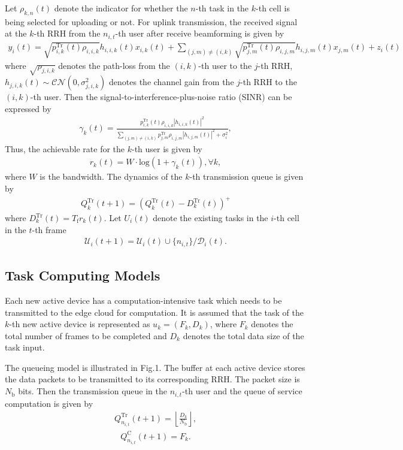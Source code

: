% 
Let $\rho_{k, n}(t)$ denote the indicator for whether the $n$-th task in the $k$-th cell is being selected for uploading or not.
For uplink transmission, the received signal at the $k$-th RRH from the $n_{i,t}$-th user after receive beamforming is given by
\begin{align}
    y_{i}(t) = \sqrt{p_{i,k}^{\mathrm{Tr}}(t)\rho_{i,i,k}}h_{i,i,k}(t)x_{i,k}(t)+\sum_{(j,m)\neq (i,k)}\sqrt{p_{j,m}^{\mathrm{Tr}}(t)\rho_{i,j,m}}h_{i,j,m}(t)x_{j,m}(t)+z_{i}(t)
\end{align}
where $\sqrt{\rho_{j,i,k}}$ denotes the path-loss from the $(i,k)$-th user to the $j$-th RRH, $h_{j,i,k}(t)\sim \mathcal{CN}(0,\sigma_{j,i,k}^{2})$ denotes the channel gain from the $j$-th RRH to the $(i,k)$-th user.
Then the signal-to-interference-plus-noise ratio (SINR) can be expressed by
\begin{align}
    \gamma_{k}(t)=\frac{p_{i,k}^{\mathrm{Tr}}(t)\rho_{i,i,k}|h_{i,i,k}(t)|^2}{\sum_{(j,m)\neq (i,k)}p_{j,m}^{\mathrm{Tr}}\rho_{i,j,m}|h_{i,j,m}(t)|^{2}+\sigma_{i}^{2}},
\end{align}
Thus, the achievable rate for the $k$-th user is given by
\begin{align}
    r_{k}(t)= W\cdot \text{log}(1+\gamma_{k}(t)), \forall k,
\end{align}
where $W$ is the bandwidth.
The dynamics of the $k$-th transmission queue is given by
\begin{align}
    Q_{k}^{\mathrm{Tr}}(t+1)=(Q_{k}^{\mathrm{Tr}}(t)-D_{k}^{\mathrm{Tr}}(t))^{+}
\end{align}
where $D_{k}^{\mathrm{Tr}}(t)=T_{\mathrm{f}}r_{k}(t)$.
Let ${U}_{i}(t)$ denote the existing tasks in the $i$-th cell in the $t$-th frame
\begin{align}
    \mathcal{U}_{i}(t+1)= \mathcal{U}_{i}(t)\cup\{n_{i,t}\}/\mathcal{D}_{i}(t).
\end{align}

\subsection{Task Computing Models}
Each new active device has a computation-intensive task which needs to be transmitted to the edge cloud for computation. It is assumed that the task of the $k$-th new active device is represented as $u_{k}=(F_{k},D_{k})$, where $F_{k}$ denotes the total number of frames to be completed and $D_{k}$ denotes the total data size of the task input.

The queueing model is illustrated in Fig.1.
The buffer at each active device stores the data packets to be transmitted to its corresponding RRH. The packet size is ${N_\mathrm{b}}$ bits. Then the transmission queue in the $n_{i,t}$-th user and the queue of service computation is given by
\begin{align}
    Q_{n_{i,t}}^{\mathrm{Tr}}(t+1)=\left\lfloor\frac{D_{k}}{N_\mathrm{b}}\right\rfloor,
\end{align}
\begin{align}
    Q_{n_{i,t}}^{\mathrm{C}}(t+1)=F_{k}.
\end{align}

